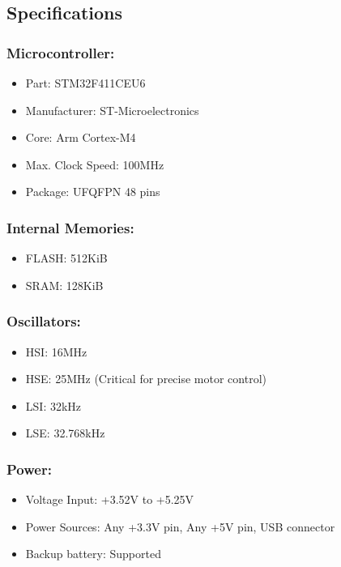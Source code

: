 \subsection{Specifications} \label{subsection:Specifications}
    \subsubsection{Microcontroller:}
    \begin{itemize}
        \item Part: STM32F411CEU6
        \item Manufacturer: ST-Microelectronics
        \item Core: Arm Cortex-M4
        \item Max. Clock Speed: 100MHz
        \item Package: UFQFPN 48 pins
    \end{itemize}

    \subsubsection{Internal Memories:}
    \begin{itemize}
        \item FLASH: 512KiB
        \item SRAM: 128KiB
    \end{itemize}

    \subsubsection{Oscillators:}
    \begin{itemize}
        \item HSI: 16MHz
        \item HSE: 25MHz (Critical for precise motor control)
        \item LSI: 32kHz
        \item LSE: 32.768kHz
    \end{itemize}

    \subsubsection{Power:}
    \begin{itemize}
        \item Voltage Input: +3.52V to +5.25V
        \item Power Sources: Any +3.3V pin, Any +5V pin, USB connector
        \item Backup battery: Supported
    \end{itemize}

